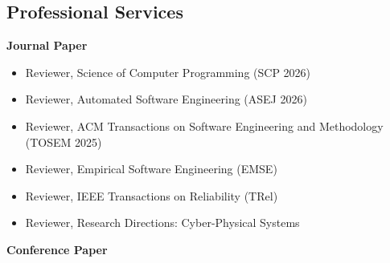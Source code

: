 \documentclass[11pt,a4paper]{moderncv}        %
\newcommand{\subsubsection}[1]{%
  \par\vspace{0.5em}%
  {\color{color1}\bfseries #1}%
  \par\vspace{0.25em}%
}
\begin{document}
\subsection{Professional Services}

\subsubsection{Journal Paper}

\begin{itemize}
    \item Reviewer, Science of Computer Programming (SCP 2026)
    \item Reviewer, Automated Software Engineering (ASEJ 2026)
    \item Reviewer, ACM Transactions on Software Engineering and Methodology (TOSEM 2025)
    \item Reviewer, Empirical Software Engineering (EMSE)
    \item Reviewer, IEEE Transactions on Reliability (TRel)
    \item Reviewer, Research Directions: Cyber-Physical Systems
\end{itemize}

\subsubsection{Conference Paper}
\end{document}
